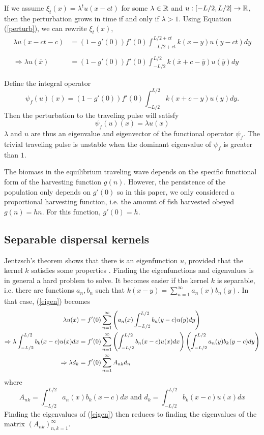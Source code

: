 \documentclass[12pt,english]{article}
\begin{document}
If we assume $\xi_t(x)=\lambda^tu(x-ct)$ for some $\lambda\in{\mathbb{R}}$ and $u:[-L/2,L/2]\to{\mathbb{R}}$, then the perturbation grows in time if and only if $\lambda >1$.  Using Equation (\ref{perturb}), we can rewrite $\xi_t(x)$,
\begin{align*}
\lambda u(x-ct-c)&=(1-g'(0))f'(0)\int_{-L/2+ct}^{L/2+ct}k(x-y)u(y-ct)dy
\\ \\\Rightarrow \lambda u(\overline{x})&=(1-g'(0))f'(0)\int_{-L/2}^{L/2}k(\overline{x}+c-\overline{y})u(\overline{y})dy
\end{align*}

Define the integral operator
$$ \psi_f(u)(x)=(1-g'(0))f'(0)\int_{-L/2}^{L/2}k(x+c-y)u(y)dy. $$
Then the perturbation to the traveling pulse will satisfy 
\begin{equation} \psi_f(u)(x)=\lambda u(x) \label{eigen} \end{equation}
$\lambda$ and $u$ are thus an eigenvalue and eigenvector of the functional operator $\psi_f$.  The trivial traveling pulse is unstable when the dominant eigenvalue of $\psi_f$ is greater than $1$.


The biomass in the equilibrium traveling wave depends on the specific functional form of the harvesting function $g(n)$.  However, the persistence of the population only depends on $g'(0)$ so in this paper, we only considered a proportional harvesting function, i.e. the amount of fish harvested obeyed $g(n)=hn$.  For this function, $g'(0)=h$.  

\subsection{Separable dispersal kernels \label{sep}}
Jentzsch's theorem shows that there is an eigenfunction $u$, provided that the kernel $k$ satisfies some properties \citep{ZhouKot2011}.  Finding the eigenfunctions and eigenvalues is in general a hard problem to solve.  It becomes easier if the kernel $k$ is separable, i.e. there are functions $a_n,b_n$ such that $k(x-y)=\sum_{n=1}^\infty a_n(x)b_n(y)$.  In that case, (\ref{eigen}) becomes
\begin{align}
\lambda u(x)&=f'(0)\sum_{n=1}^\infty\left( a_n(x)\int_{-L/2}^{L/2}b_n(y-c)u(y)dy\right) \notag
\\ \Rightarrow \lambda\int_{-L/2}^{L/2}b_k(x-c)u(x)dx&=f'(0)\sum_{n=1}^{\infty}\left(\int_{-L/2}^{L/2}b_n(x-c)u(x)dx\right)\left(\int_{-L/2}^{L/2}a_n(y)b_k(y-c)dy\right) \notag
\\ \Rightarrow \lambda d_k&=f'(0)\sum_{n=1}^\infty A_{nk}d_n  \label{problem}
\end{align}
where
\begin{equation*}
A_{nk}=\int_{-L/2}^{L/2}a_n(x)b_k(x-c)dx \text{ and } d_k=\int_{-L/2}^{L/2}b_k(x-c)u(x)dx
\end{equation*}
Finding the eigenvalues of (\ref{eigen}) then reduces to finding the eigenvalues of the matrix $(A_{nk})_{n,k=1}^\infty$.
\end{document}
